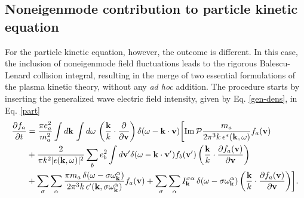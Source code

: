 \documentclass[12pt,a4paper,ruledheader]{report}
\begin{document}
\subsection{Noneigenmode contribution to particle kinetic equation}
For the particle kinetic equation, however, the outcome is different.
In this case, the inclusion of noneigenmode field fluctuations leads to
the rigorous Balescu-Lenard collision integral, resulting in the merge
of two essential formulations of the plasma kinetic theory, without any
\emph{ad hoc} addition. The procedure starts by inserting the generalized wave
electric field intensity, given by Eq. \eqref{gen-dens}, in Eq. \eqref{part}
\begin{equation}
  \begin{split}
  \frac{\partial f_a}{\partial t}&=\frac{\pi e_a^2}{m_a^2}
  \int d{\bf k}\, \int d\omega\,
  \left( \frac{\bf k}{k}\cdot \frac{\partial}{\partial {\bf v}}\right)
  \delta(\omega -{\bf k \cdot v})
  \biggl[\mbox{Im}\, \mathcal{P} \frac{m_a}
    {2\pi^3k\, \epsilon^*({\bf k},\omega)} f_a({\bf v})\\
    &+\frac{2}{\pi k^2|\epsilon({\bf k},\omega)|^2}
    \sum_b e_b^2\int d{\bf v'} \delta(\omega-{\bf k\cdot v'})
    f_b({\bf v '})\left( \frac{\bf k}{k}\cdot
    \frac{\partial f_a({\bf v})}{\partial {\bf v}}\right)\\
  &+\sum_\sigma\sum_\alpha\frac{\pi m_a\,\delta(\omega-\sigma\omega_{\bf k}^\alpha)}
      {2\pi^3 k\, \epsilon '({\bf k},\sigma\omega_{\bf k}^\alpha)}f_a({\bf v})
      +\sum_\sigma\sum_\alpha I_{\bf k}^{\sigma \alpha}\,
      \delta(\omega-\sigma\omega_{\bf k}^\alpha)
      \left( \frac{\bf k}{k}\cdot
      \frac{\partial f_a({\bf v})}{\partial {\bf v}}\right)\biggr].
  \end{split}
\label{part-eig}
\end{equation}
\end{document}
